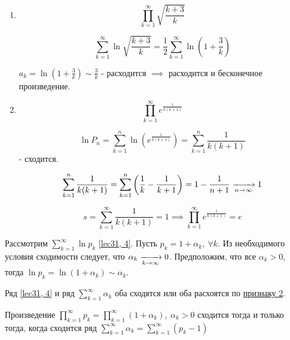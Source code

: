 \documentclass[../../main.tex]{subfiles}
\begin{document}
	\begin{example}
		\begin{enumerate}[label=\arabic*)]
			\item \[\prod\limits_{k = 1}^{\infty} \sqrt{\frac{k + 3}{k}}\]
			
			\[\sum\limits_{k = 1}^{\infty} \ln \sqrt{\frac{k + 3}{k}} = \frac{1}{2} \sum\limits_{k = 1}^{\infty} \ln\left(1 + \frac{3}{k}\right) \]
			
			$a_k = \ln \left(1 + \frac{3}{k}\right) \sim \frac{3}{k}$ - расходится $\implies$ расходится и бесконечное произведение.
			
			\item \[\prod\limits_{k = 1}^{\infty} e^{\frac{1}{k(k + 1)}} \]
			
			\[\ln P_n = \sum\limits_{k = 1}^{n} \ln \left(e^{\frac{1}{k(k + 1)}}\right) = \sum\limits_{k = 1}^{n} \frac{1}{k(k + 1)}\] - сходится.
			
			\[\sum\limits_{k = 1}^{n} \frac{1}{k(k + 1)} = \sum\limits_{k = 1}^{n} \left(\frac{1}{k} - \frac{1}{k + 1} \right) = 1 - \frac{1}{n + 1} \xrightarrow[n \to \infty]{} 1 \]
			
			\[s = \sum\limits_{k = 1}^{\infty} \frac{1}{k(k + 1)} = 1 \implies \prod\limits_{k = 1}^{\infty} e^{\frac{1}{k(k + 1)}} = e\]
		\end{enumerate}
	\end{example}

	Рассмотрим $\sum\limits_{k = 1}^{\infty} \ln p_k$ \eqref{lec31, 4}. Пусть $p_k = 1 + \alpha_k,\ \forall k$. Из необходимого условия сходимости следует, что $\alpha_k \xrightarrow[k \to \infty]{} 0$. Предположим, что все $\alpha_k > 0$, тогда $\ln p_k = \ln (1 + \alpha_k) \sim \alpha_k$.
	
	Ряд \eqref{lec31, 4} и ряд $\sum\limits_{k = 1}^{\infty} \alpha_k$ оба сходятся или оба расхоятся по \hyperref[lec26:comp_test_2]{признаку 2\textdegree}.
	
	\begin{thm}\label{lec31:thm2} 
		Произведение $\prod\limits_{k = 1}^{\infty} p_k = \prod\limits_{k = 1}^{\infty}(1 + \alpha_k),\ \alpha_k > 0$ сходится тогда и только тогда, когда сходится ряд $\sum\limits_{k = 1}^{\infty} \alpha_k = \sum\limits_{k = 1}^{\infty} (p_k - 1)$
	\end{thm}		
\end{document}
